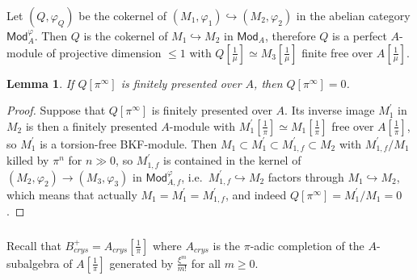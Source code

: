 \documentclass[11pt]{article}
\newtheorem{lemm}[theo]{Lemma}
\theoremstyle{definition}
\numberwithin{equation}{section}
\numberwithin{figure}{section}
\numberwithin{table}{section}
\newcommand{\Mod}{\mathsf{Mod}}
\begin{document}
Let $(Q,\varphi_{Q})$ be the cokernel of $(M_{1},\varphi_{1})\hookrightarrow(M_{2},\varphi_{2})$ in the abelian category $\Mod_{A}^{\varphi}$. Then $Q$ is the cokernel of $M_{1}\hookrightarrow M_{2}$ in $\Mod_{A}$, therefore $Q$ is a perfect $A$-module of projective dimension $\leq1$ with $Q[\frac{1}{\mu}]\simeq M_{3}[\frac{1}{\mu}]$ finite free over $A[\frac{1}{\mu}]$.

\begin{lemm}
If $Q[\pi^{\infty}]$ is finitely presented over $A$, then $Q[\pi^{\infty}]=0$.
\end{lemm}

\begin{proof}
Suppose that $Q[\pi^{\infty}]$ is finitely presented over $A$. Its inverse image $M_{1}^{\prime}$ in $M_{2}$ is then a finitely presented $A$-module with $M_{1}^{\prime}[\frac{1}{\pi}]\simeq M_{1}[\frac{1}{\pi}]$ free over $A[\frac{1}{\pi}]$, so $M_{1}^{\prime}$ is a torsion-free BKF-module. Then $M_{1}\subset M_{1}^{\prime}\subset M_{1,f}^{\prime}\subset M_{2}$ with $M_{1,f}^{\prime}/M_{1}$ killed by $\pi^{n}$ for $n\gg0$, so $M_{1,f}^{\prime}$ is contained in the kernel of $(M_{2},\varphi_{2})\rightarrow(M_{3},\varphi_{3})$ in $\Mod_{A,f}^{\varphi}$, i.e.~$M_{1,f}^{\prime}\hookrightarrow M_{2}$ factors through $M_{1}\hookrightarrow M_{2}$, which means that actually $M_{1}=M_{1}^{\prime}=M_{1,f}^{\prime}$, and indeed $Q[\pi^{\infty}]=M_{1}^{\prime}/M_{1}=0$.
\end{proof}

\subsubsection{}

Recall that $B_{crys}^{+}=A_{crys}[\frac{1}{\pi}]$ where $A_{crys}$ is the $\pi$-adic completion of the $A$-subalgebra of $A[\frac{1}{\pi}]$ generated by $\frac{\xi^{m}}{m!}$ for all $m\geq0$.
\end{document}
